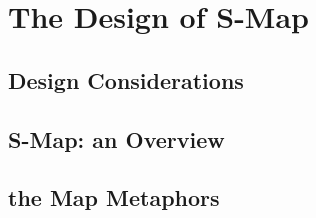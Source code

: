\section{The Design of S-Map}
\subsection{Design Considerations}
\subsection{S-Map: an Overview}
\subsection{the Map Metaphors}